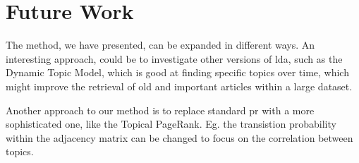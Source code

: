 \section{Future Work}\label{sec:future_work}

The method, we have presented, can be expanded in different ways. 
An interesting approach, could be to investigate other versions of \gls{lda}, such as the Dynamic Topic Model\cite{blei2006dynamic}, which is good at finding specific topics over time, which might improve the retrieval of old and important articles within a large dataset.

Another approach to our method is to replace standard \gls{pr} with a more sophisticated one, like the Topical PageRank\cite{yang2009topic}. 
Eg. the transistion probability within the adjacency matrix can be changed to focus on the correlation between topics.